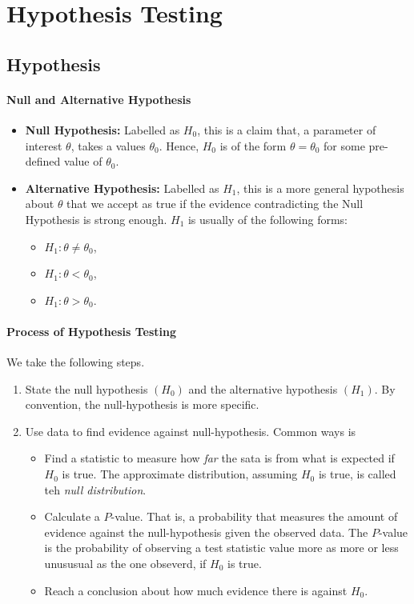 \section{Hypothesis Testing}

\subsection{Hypothesis}

\paragraph{Null and Alternative Hypothesis}
\begin{itemize}
  \item \textbf{Null Hypothesis:} Labelled as \(H_0\), this is a claim that, a parameter
    of interest  \(\theta\), takes a values \(\theta_0\). Hence,
      \(H_0\) is of the form  \(\theta = \theta_0\) for some pre-defined
      value of \(\theta_0\).
  \item \textbf{Alternative Hypothesis:} Labelled as \(H_1\),
    this is a more general hypothesis about  \(\theta\) that we accept as true if the
    evidence contradicting the Null Hypothesis is strong enough. \(H_1\) is usually
    of the following forms:
     \begin{itemize}
      \item \(H_1: \theta \neq  \theta_0\),
      \item \(H_1: \theta <  \theta_0\),
      \item \(H_1: \theta >  \theta_0\).
    \end{itemize}
\end{itemize}

\paragraph{Process of Hypothesis Testing}
We take the following steps.
\begin{enumerate}
  \item State the null hypothesis \((H_0)\) and the alternative hypothesis  \((H_1)\).
    By convention, the null-hypothesis is more specific.
  \item Use data to find evidence against null-hypothesis. Common ways is
     \begin{itemize}
       \item Find a statistic to measure how \textit{far} the sata is from what is expected
         if \(H_0\) is true. The approximate distribution, assuming  \(H_0\)
         is true, is called teh \textit{null distribution}.
       \item  Calculate a \(P\)-value. That is, a probability that measures the amount
         of evidence against the null-hypothesis given the observed data.
         The  \(P\)-value is the probability of observing a test statistic
         value more as more or less unususual as the one obseverd, if  \(H_0\)
         is true.
       \item Reach a conclusion about how much evidence there is against \(H_0\).
    \end{itemize}
\end{enumerate}


